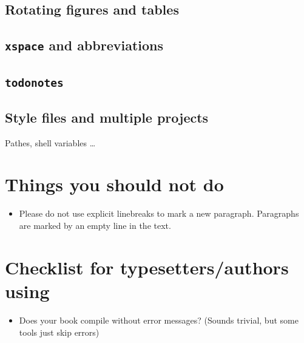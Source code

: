 \subsection{Rotating figures and tables}
 

\subsection{\texttt{xspace} and abbreviations}


\subsection{\texttt{todonotes}}





\subsection{Style files and multiple projects}

Pathes, shell variables \ldots

\section{Things you should not do}

\begin{itemize}
\item Please do not use explicit linebreaks to mark a new paragraph. Paragraphs are marked by an empty
line in the text.
\end{itemize}

\section{Checklist for typesetters/authors using \latex}
\label{sec-check-typesetters}

\begin{itemize}
\item Does your book compile without error messages? (Sounds trivial, but some tools just skip
  \latex errors)
\end{itemize}


